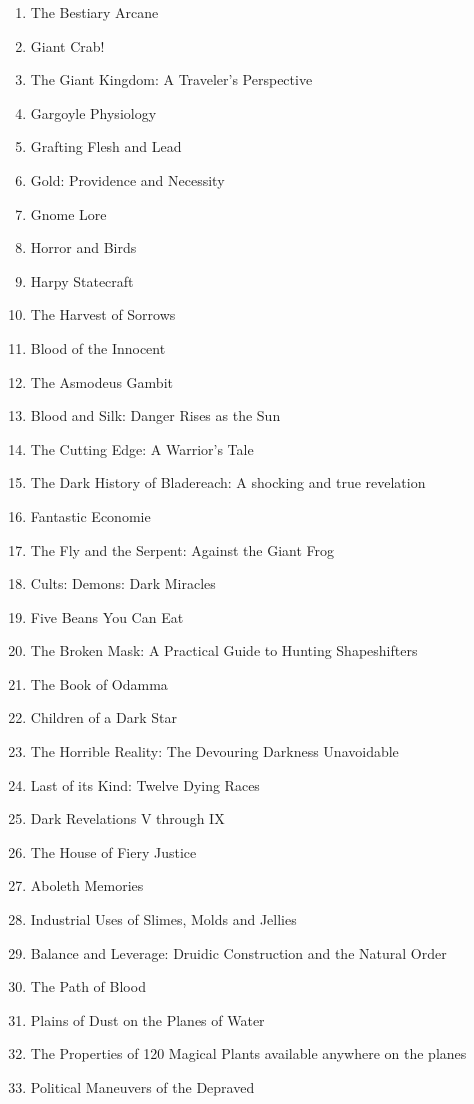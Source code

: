 \begin{enumerate}
	\item The Bestiary Arcane
	\item Giant Crab!
	\item The Giant Kingdom: A Traveler's Perspective
	\item Gargoyle Physiology
	\item Grafting Flesh and Lead
	\item Gold: Providence and Necessity
	\item Gnome Lore
	\item Horror and Birds
	\item Harpy Statecraft
	\item The Harvest of Sorrows
	\item Blood of the Innocent
	\item The Asmodeus Gambit
	\item Blood and Silk: Danger Rises as the Sun
	\item The Cutting Edge: A Warrior's Tale
	\item The Dark History of Bladereach: A shocking and true revelation
	\item Fantastic Economie
	\item The Fly and the Serpent: Against the Giant Frog
	\item Cults: Demons: Dark Miracles
	\item Five Beans You Can Eat
	\item The Broken Mask: A Practical Guide to Hunting Shapeshifters
	\item The Book of Odamma
	\item Children of a Dark Star
	\item The Horrible Reality: The Devouring Darkness Unavoidable
	\item Last of its Kind: Twelve Dying Races
	\item Dark Revelations V through IX
	\item The House of Fiery Justice
	\item Aboleth Memories
	\item Industrial Uses of Slimes, Molds and Jellies
	\item Balance and Leverage: Druidic Construction and the Natural Order
	\item The Path of Blood
	\item Plains of Dust on the Planes of Water
	\item The Properties of 120 Magical Plants available anywhere on the planes
	\item Political Maneuvers of the Depraved

\end{enumerate}
